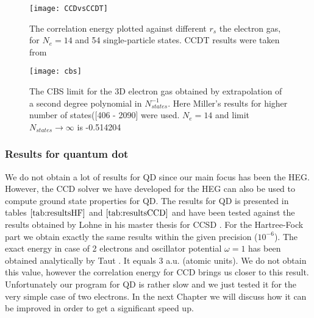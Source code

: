 \begin{figure}[ht!]
	\centering
	\texttt{[image: CCDvsCCDT]}
	\caption{The correlation energy plotted against different $r_s$ the  electron gas, for $N_e=14$ and 54 single-particle states. CCDT results were taken from \cite{hansenCoupledClusterStudies}}
	\label{fig:CCDvsCCDT}
\end{figure}

\begin{figure}[ht!]
	\centering
	\texttt{[image: cbs]}
	\caption{The CBS limit for the 3D electron gas obtained by extrapolation of a second degree polynomial in $N_{states}^{-1}$. Here Miller's \cite{millerAntumMechanicalStudies} results for higher number of states([406 - 2090] were used. $N_e=14$ and limit $N_{states} \rightarrow \infty$ is -0.514204  }
	\label{fig:CBS}
\end{figure}



\subsubsection{Results for quantum dot}
We do not obtain a lot of results for QD since  our main focus has been the 
HEG. However, the  CCD solver we have developed for the HEG can also be
used to compute ground state properties for QD. The results for QD is
presented in tables $\ref{tab:resultsHF}$ and $\ref{tab:resultsCCD}$ and
have been tested against the results obtained by Lohne in his master
thesis for CCSD \cite{lohneCOUPLEDCLUSTERSTUDIESQUANTUM}. For the
Hartree-Fock part we obtain exactly the same results within the given
precision ($10^{-6}$).  The exact energy in case of 2 electrons and
oscillator potential $\omega=1$ has been obtained analytically by Taut
\cite{tautTwoElectronsExternal1993a}. It equals 3 a.u. (atomic units). We do
not obtain this value, however the correlation energy for CCD brings
us closer to this result. Unfortunately our program for QD is rather
slow and we just tested it for the very simple case of two
electrons. In the next Chapter we will discuss how it can be improved
in order to get a significant speed up.


